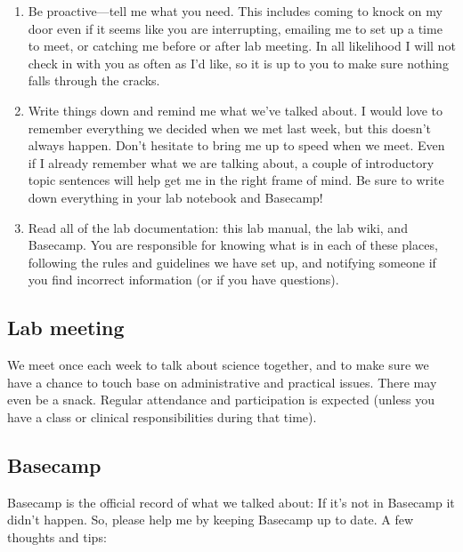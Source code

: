 \documentclass[letterpaper,12pt,oneside]{memoir}
\begin{document}
\begin{enumerate}
\item Be proactive---tell me what you need. This includes coming to knock on my door even if it seems like you are interrupting, emailing me to set up a time to meet, or catching me before or after lab meeting. In all likelihood I will not check in with you as often as I'd like, so it is up to you to make sure nothing falls through the cracks.

\item Write things down and remind me what we've talked about. I would love to remember everything we decided when we met last week, but this doesn't always happen. Don't hesitate to bring me up to speed when we meet. Even if I already remember what we are talking about, a couple of introductory topic sentences will help get me in the right frame of mind. Be sure to write down everything in your lab notebook and Basecamp!

\item Read all of the lab documentation: this lab manual, the lab wiki, and Basecamp. You are responsible for knowing what is in each of these places, following the rules and guidelines we have set up, and notifying someone if you find incorrect information (or if you have questions).
\end{enumerate}

\subsection{Lab meeting}
We meet once each week to talk about science together, and to make sure we have a chance to touch base on administrative and practical issues. There may even be a snack. Regular attendance and participation is expected (unless you have a class or clinical responsibilities during that time).


\subsection{Basecamp}
Basecamp is the official record of what we talked about: If it's not in Basecamp it didn't happen. So, please help me by keeping Basecamp up to date. A few thoughts and tips:
\end{document}
